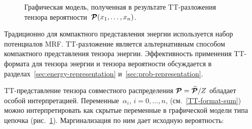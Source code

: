 \begin{figure}
\begin{center}
{}
\caption{Графическая модель, полученная в результате TT\hyp{}разложения тензора вероятности~$\boldsymbol{\mathcal{P}}(x_1, \ldots, x_n)$.}
\label{fig:TT-graphical-model}
\end{center}
\vskip -0.2in
\end{figure}


Традиционно для компактного представления энергии используется набор потенциалов MRF. TT\hyp{}разложение является альтернативным способом компактного представления тензора энергии. Эффективность применения TT\hyp{}формата для тензора энергии и тензора вероятности обсуждается в разделах~\ref{sec:energy-representation} и~\ref{sec:prob-representation}.


TT\hyp{}представление тензора совместного распределения $\boldsymbol{\mathcal{P}} = \boldsymbol{\mathcal{\widehat{P}}} / Z$ обладает особой интерпретацией. Переменные~$\alpha_i$, $i=0,\ldots,n$, (см.~\eqref{TT-format-sum}) можно интерпретировать как скрытые переменные в графической модели типа цепочка (рис.~\ref{fig:TT-graphical-model}). Маргинализация по ним дает исходную вероятность:

